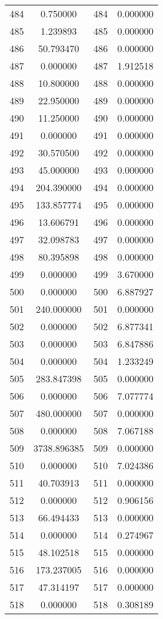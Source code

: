 \documentclass[12pt]{article}
\begin{document}
\begin{longtable}{@{}cccc@{}}
484 & 0.750000 & 484 & 0.000000 \\
485 & 1.239893 & 485 & 0.000000 \\
486 & 50.793470 & 486 & 0.000000 \\
487 & 0.000000 & 487 & 1.912518 \\
488 & 10.800000 & 488 & 0.000000 \\
489 & 22.950000 & 489 & 0.000000 \\
490 & 11.250000 & 490 & 0.000000 \\
491 & 0.000000 & 491 & 0.000000 \\
492 & 30.570500 & 492 & 0.000000 \\
493 & 45.000000 & 493 & 0.000000 \\
494 & 204.390000 & 494 & 0.000000 \\
495 & 133.857774 & 495 & 0.000000 \\
496 & 13.606791 & 496 & 0.000000 \\
497 & 32.098783 & 497 & 0.000000 \\
498 & 80.395898 & 498 & 0.000000 \\
499 & 0.000000 & 499 & 3.670000 \\
500 & 0.000000 & 500 & 6.887927 \\
501 & 240.000000 & 501 & 0.000000 \\
502 & 0.000000 & 502 & 6.877341 \\
503 & 0.000000 & 503 & 6.847886 \\
504 & 0.000000 & 504 & 1.233249 \\
505 & 283.847398 & 505 & 0.000000 \\
506 & 0.000000 & 506 & 7.077774 \\
507 & 480.000000 & 507 & 0.000000 \\
508 & 0.000000 & 508 & 7.067188 \\
509 & 3738.896385 & 509 & 0.000000 \\
510 & 0.000000 & 510 & 7.024386 \\
511 & 40.703913 & 511 & 0.000000 \\
512 & 0.000000 & 512 & 0.906156 \\
513 & 66.494433 & 513 & 0.000000 \\
514 & 0.000000 & 514 & 0.274967 \\
515 & 48.102518 & 515 & 0.000000 \\
516 & 173.237005 & 516 & 0.000000 \\
517 & 47.314197 & 517 & 0.000000 \\
518 & 0.000000 & 518 & 0.308189 \\

\end{longtable}
\end{document}
